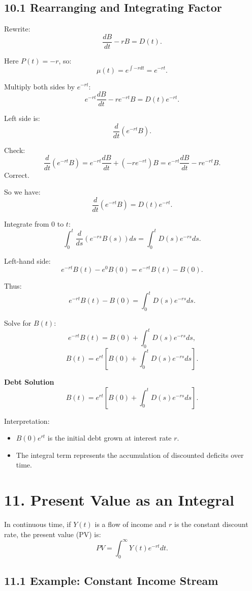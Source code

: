 \documentclass[12pt]{article}
\begin{document}
\subsection*{10.1 Rearranging and Integrating Factor}

Rewrite:
\[
\frac{dB}{dt} - rB = D(t).
\]

Here $P(t) = -r$, so:
\[
\mu(t) = e^{\int -r dt} = e^{-rt}.
\]

Multiply both sides by $e^{-rt}$:
\[
e^{-rt}\frac{dB}{dt} - r e^{-rt} B = D(t) e^{-rt}.
\]

Left side is:
\[
\frac{d}{dt}(e^{-rt}B).
\]

Check:
\[
\frac{d}{dt}(e^{-rt}B) = e^{-rt}\frac{dB}{dt} + (-r e^{-rt})B = e^{-rt}\frac{dB}{dt} - r e^{-rt} B.
\]
Correct.

So we have:
\[
\frac{d}{dt}(e^{-rt}B) = D(t) e^{-rt}.
\]

Integrate from $0$ to $t$:
\[
\int_0^t \frac{d}{ds}(e^{-rs}B(s)) ds = \int_0^t D(s)e^{-rs}ds.
\]

Left-hand side:
\[
e^{-rt}B(t) - e^{0}B(0) = e^{-rt}B(t) - B(0).
\]

Thus:
\[
e^{-rt}B(t) - B(0) = \int_0^t D(s)e^{-rs}ds.
\]

Solve for $B(t)$:
\[
e^{-rt}B(t) = B(0) + \int_0^t D(s)e^{-rs}ds,
\]
\[
B(t) = e^{rt}\left[ B(0) + \int_0^t D(s)e^{-rs}ds \right].
\]

\begin{tcolorbox}
\textbf{Debt Solution}  
\[
B(t) = e^{rt}\left[ B(0) + \int_0^t D(s)e^{-rs}ds \right].
\]

Interpretation:
\begin{itemize}
\item $B(0)e^{rt}$ is the initial debt grown at interest rate $r$.
\item The integral term represents the accumulation of discounted deficits over time.
\end{itemize}
\end{tcolorbox}

\section*{11. Present Value as an Integral}

In continuous time, if $Y(t)$ is a flow of income and $r$ is the constant discount rate, the present value (PV) is:
\[
PV = \int_0^\infty Y(t) e^{-rt}dt.
\]

\subsection*{11.1 Example: Constant Income Stream}
\end{document}
